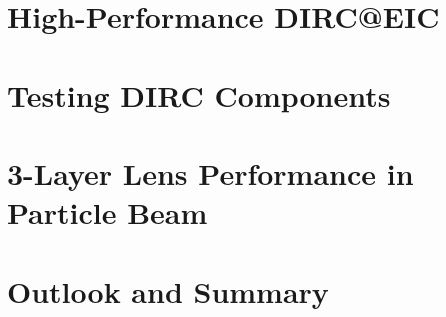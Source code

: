 \documentclass[12pt]{report}
\numberwithin{equation}{chapter}
\begin{document}
\chapter{High-Performance DIRC@EIC}
%
\chapter{Testing DIRC Components}
%
\chapter{3-Layer Lens Performance in Particle Beam}
%
\chapter{Outlook and Summary}



{}



\appendix



\newpage


\vitapage
\end{document}
